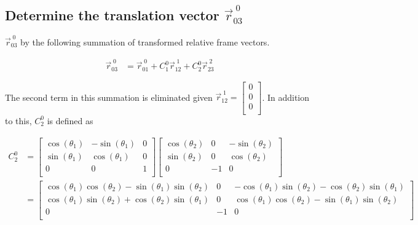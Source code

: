 \begin{parts}
    \part{Determine the translation vector $\vec{r}^{\;0}_{03}$}

    \solution
    $\vec{r}^{\;0}_{03}$ by the following summation of transformed relative frame vectors.

    \begin{equation}
        \begin{split}
            \vec{r}^{\;0}_{03} & = \vec{r}^{\;0}_{01} + C_1^0\vec{r}^{\;1}_{12} + C_2^0\vec{r}^{\;2}_{23}
        \end{split}
    \end{equation}

    The second term in this summation is eliminated given $\vec{r}^{\;1}_{12} =
        \begin{bmatrix}
            0 \\
            0 \\
            0 \\
        \end{bmatrix}$. In addition to this, $C_2^0$ is defined as

    \begin{equation*}
        \begin{split}
            C_2^0 & =
            \begin{bmatrix}
                \cos(\theta_1) & -\sin(\theta_1) & 0 \\
                \sin(\theta_1) & \cos(\theta_1)  & 0 \\
                0              & 0               & 1 \\
            \end{bmatrix}
            \begin{bmatrix}
                \cos(\theta_2) & 0  & -\sin(\theta_2) \\
                \sin(\theta_2) & 0  & \cos(\theta_2)  \\
                0              & -1 & 0               \\
            \end{bmatrix} \\
            & =
            \begin{bmatrix}
                \cos(\theta_1)\cos(\theta_2) - \sin(\theta_1)\sin(\theta_2) & 0  & -\cos(\theta_1)\sin(\theta_2) - \cos(\theta_2)\sin(\theta_1) \\
                \cos(\theta_1)\sin(\theta_2) + \cos(\theta_2)\sin(\theta_1) & 0  & \cos(\theta_1)\cos(\theta_2)-\sin(\theta_1)\sin(\theta_2)    \\
                0                                                           & -1 & 0                                                            \\
            \end{bmatrix}
        \end{split}
    \end{equation*}


\end{parts}
